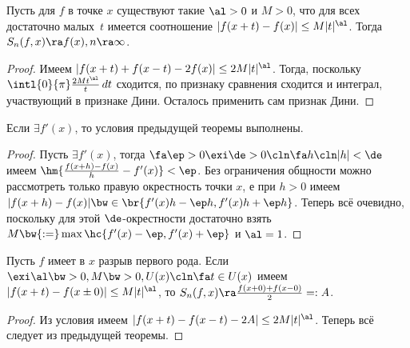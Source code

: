 \documentclass[a4paper]{article}
\newcommand{\intlop}{\intl{0}{\pi}}
\begin{document}
\begin{theorem}
Пусть для $f$ в точке $x$ существуют такие $\al > 0$ и $M>0$, что для всех достаточно малых~$t$ имеется
соотношение $|f(x+t)-f(x)|\le M|t|^\al$. Тогда $S_n(f,x) \ra f(x), n\ra \infty$.
\end{theorem}
\begin{proof}
Имеем $|f(x+t) + f(x-t) - 2f(x)| \le 2M|t|^\al$. Тогда, поскольку $\intlop\frac{2Mt^\al}{t}\,d t$
сходится, по признаку сравнения сходится и интеграл, участвующий в признаке Дини. Осталось
применить сам признак Дини.
\end{proof}

\begin{imp}\label{diff:dini}
Если $\exi f'(x)$, то условия предыдущей теоремы выполнены.
\end{imp}
\begin{proof}
Пусть $\exi f'(x)$, тогда $\fa \ep > 0 \exi \de > 0\cln \fa h\cln |h|<\de$ имеем $\hm{\frac{f(x+h)-f(x)}{h} - f'(x)}<\ep$.
Без ограничения общности можно рассмотреть только правую окрестность точки $x$, е при $h > 0$ имеем
$|f(x+h) - f(x)| \bw\in \br{f'(x)h-\ep h, f'(x)h + \ep h}$. Теперь всё очевидно, поскольку для этой $\de$-окрестности
достаточно взять $M \bw{:=} \max\hc{f'(x)-\ep, f'(x) + \ep}$ и $\al = 1$.
\end{proof}

\begin{imp}
Пусть $f$ имеет в $x$ разрыв первого рода. Если $\exi\al\bw>0, M \bw>0, U(x)\cln \fa t \in U(x)$ имеем $|f(x+t)-f(x\pm 0)|\le M|t|^\al$,
то $S_n(f,x) \ra \frac{f(x+0)+f(x-0)}{2} =: A$.
\end{imp}
\begin{proof}
Из условия имеем $|f(x+t)-f(x-t) - 2A| \le 2M|t|^\al$. Теперь всё следует из предыдущей теоремы.
\end{proof}
\end{document}
